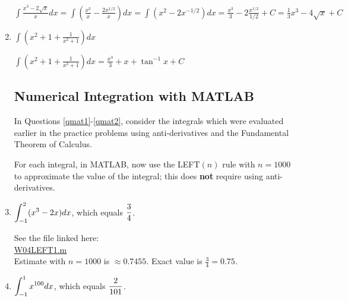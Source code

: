 \begin{enumerate}[1.]
\begin{Question}
\end{Question}

\begin{Solution}
  $\int \frac{x^3 - 2 \sqrt{x}}{x} dx = 
  \int \left( \frac{x^3}{x} - \frac{2x^{1/2}}{x} \right) dx =
  \int (x^2 - 2x^{-1/2})dx =
  \frac{x^3}{3} - 2 \frac{x^{1/2}}{1/2} + C =
  \frac{1}{3} x^3 - 4 \sqrt{x} + C$
\end{Solution}

      
\item
  \begin{Question}
    $\int \left( x^2 + 1 + \frac{1}{x^2 + 1} \right) dx$
  \end{Question}
  
  \begin{Solution}
    $\int \left( x^2 + 1 + \frac{1}{x^2 + 1} \right) dx =
    \frac{x^3}{3} + x + \tan^{-1} x + C$
  \end{Solution}


\hrulefill

\subsection*{Numerical Integration with MATLAB}

\begin{Question}
  In Questions \ref{qmat1}-\ref{qmat2}, consider the integrals which
  were evaluated earlier in the practice problems using anti-derivatives
and the Fundamental Theorem of Calculus.

For each integral, in MATLAB, now use the LEFT$(n)$ rule with $n=1000$
to approximate the value of the integral; this does {\bf not} require
using anti-derivatives.
\end{Question}
\item \begin{Question} \label{qmat1}
  $\displaystyle \int_{-1}^2 (x^3 - 2x) dx$, which equals $\displaystyle \frac{3}{4}$.
\end{Question}

\begin{Solution}
  See the file linked here: \\
  \href{http://www.mast.queensu.ca/~apsc171/MNTCP01/PracticeProblems/MATLAB/W04LEFT1.m}{W04LEFT1.m} \\
  Estimate with $n = 1000$ is $\approx 0.7455$.  Exact value is $\frac{3}{4} = 0.75$.
\end{Solution}
\item \begin{Question}
  $\displaystyle \int_{-1}^1 x^{100} dx$, which equals $\displaystyle \frac{2}{101}$.
\end{Question}


\end{enumerate}
